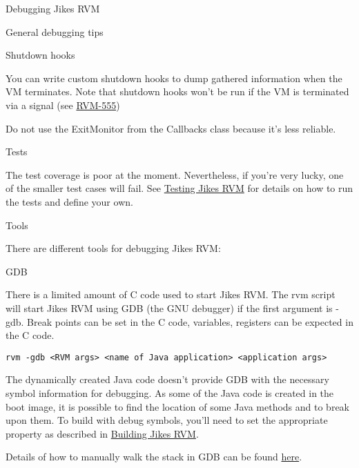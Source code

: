 \begin{section}{Debugging Jikes RVM}
\begin{subsection}{General debugging tips}
\begin{subsubsection}{Shutdown hooks}

You can write custom shutdown hooks to dump gathered information when the VM terminates. Note that shutdown hooks won't be run if the VM is terminated via a signal (see \href{https://xtenlang.atlassian.net/browse/RVM-555}{RVM-555})

Do not use the ExitMonitor from the Callbacks class because it's less reliable.

\end{subsubsection}

\begin{subsubsection}{Tests}

The test coverage is poor at the moment. Nevertheless, if you're very lucky, one of the smaller test cases will fail. See \hyperref[sec:testingjikesrvm]{Testing Jikes RVM} for details on how to run the tests and define your own.

\end{subsubsection}

\end{subsection}

\begin{subsection}{Tools}

There are different tools for debugging Jikes RVM:

\begin{subsubsection}{GDB}

There is a limited amount of C code used to start Jikes RVM. The rvm script will start Jikes RVM using GDB (the GNU debugger) if the first argument is -gdb. Break points can be set in the C code, variables, registers can be expected in the C code.

\begin{lstlisting}
rvm -gdb <RVM args> <name of Java application> <application args>
\end{lstlisting}

The dynamically created Java code doesn't provide GDB with the necessary symbol information for debugging. As some of the Java code is created in the boot image, it is possible to find the location of some Java methods and to break upon them. To build with debug symbols, you'll need to set the appropriate property as described in \hyperref[sec:buildingjikesrvm]{Building Jikes RVM}.

Details of how to manually walk the stack in GDB can be found \hyperref[sec:gdbstackwalking]{here}.
\end{subsubsection}


\end{subsection}
\end{section}
